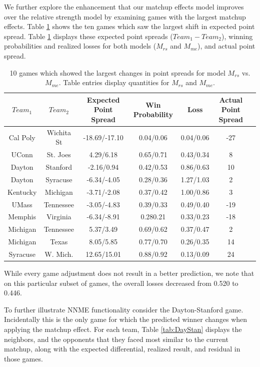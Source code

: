 \documentclass[letterpaper,12pt]{article}
\begin{document}
We further explore the enhancement that our matchup effects model improves over the relative strength model by examining games with the largest matchup effects. Table \ref{tab:change} shows the ten games which saw the largest shift in expected point spread. Table \ref{tab:change} displays these expected point spreads ($Team_1 - Team_2$), winning probabilities and realized losses for both models ($M_{rs}$ and $M_{me}$), and actual point spread. 

\begin{table}[h!]
\caption{10 games which showed the largest changes in point spreads for model $M_{rs}$ vs. $M_{me}$. Table entries display quantities for $M_{rs}$ and $M_{me}$.\label{tab:change}}
\scriptsize
\centering
\begin{tabular}{|cc | ccc |c|c|}
  \hline
  \hline
 $Team_1$ & $Team_2$ & Expected Point Spread & Win Probability & Loss & Actual Point Spread\\ 
  \hline
 Cal Poly & Wichita St & -18.69/-17.10  & 0.04/0.06 & 0.04/0.06&  -27\\ 
 UConn & St. Joes &4.29/6.18 & 0.65/0.71 & 0.43/0.34  & 8\\ 
 Dayton & Stanford & -2.16/0.94 & 0.42/0.53 & 0.86/0.63& 10 \\ 
 Dayton & Syracuse & -6.34/-4.05 & 0.28/0.36 & 1.27/1.03& 2\\ 
 Kentucky & Michigan & -3.71/-2.08 & 0.37/0.42 & 1.00/0.86 & 3\\ 
 UMass & Tennessee &-3.05/-4.83 & 0.39/0.33 & 0.49/0.40 & -19\\ 
 Memphis & Virginia & -6.34/-8.91 & 0.280.21 & 0.33/0.23 & -18\\ 
 Michigan & Tennessee & 5.37/3.49 & 0.69/0.62 & 0.37/0.47 & 2\\ 
 Michigan & Texas & 8.05/5.85 & 0.77/0.70 & 0.26/0.35 & 14\\ 
 Syracuse & W. Mich. & 12.65/15.01 & 0.88/0.92 & 0.13/0.09& 24\\ 
   \hline
   \hline
\end{tabular}
\end{table}

While every game adjustment does not result in a better prediction,  we note that on this particular subset of games, the overall losses decreased from 0.520 to 0.446. 

To further illustrate NNME functionality consider the Dayton-Stanford game.  Incidentally this is the only game for which the predicted winner changes when applying the matchup effect. For each team, Table \ref{tab:DayStan} displays the neighbors, and the opponents that they faced most similar to the current matchup, along with the expected differential, realized result, and residual in those games. 
\end{document}
